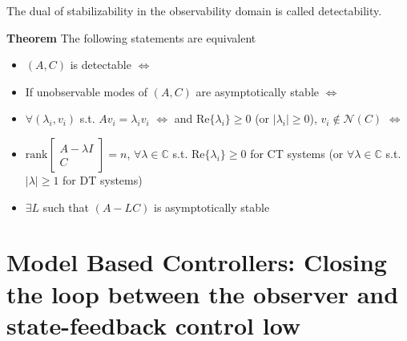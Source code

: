 \documentclass[twoside]{article}
\begin{document}
The dual of stabilizability in the observability domain is called detectability. 

\textbf{Theorem} The following statements are equivalent 
\begin{itemize}
\item $(A,C)$ is detectable $\iff$
\item If unobservable modes of $(A,C)$ are asymptotically stable $\iff$
\item $\forall (\lambda_i , v_i)$ s.t. $A v_i = \lambda_i v_i$ $\iff$
and $\mathrm{Re}\lbrace \lambda_i \rbrace \geq 0$ (or $|\lambda_i|\geq0$),
$v_i \notin \mathcal{N}(C)$ $\iff$
\item $\mathrm{rank}\left[ \begin{array}{c} A - \lambda I \\ \hline C \end{array} \right] = n$,
$\forall \lambda \in \mathbb{C}$ s.t. $\mathrm{Re}\lbrace \lambda_i \rbrace \geq 0$ for CT systems (or $\forall \lambda \in \mathbb{C}$ s.t. $|\lambda|  \geq 1$ for DT systems)
\item $\exists L$ such that $(A - L C)$ is asymptotically stable
\end{itemize}

\newpage

\section{Model Based Controllers: Closing the loop between the observer and state-feedback control low} 
\end{document}
